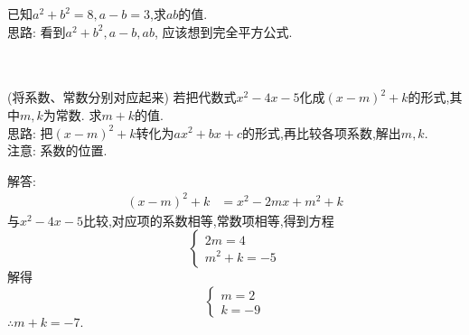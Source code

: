 \begin{comment}
    \item{
        若多项式$ 9x^2 - mx+16$是一个完全平方式,则 $m$的值是多少？
    }
    \\ \\ \\
\end{comment}

\item{
    已知$a^2+b^2=8, a-b=3$,求$ab$的值.
    \ifshowSolution
    \fangsong{}
    \\
    思路: 看到$a^2+b^2, a-b, ab$, 应该想到完全平方公式.
    \fi
}
\\ \\ \\

\begin{comment}
    \item{
        若$x^2+mx+9$是完全平方式,求常数$m$的值.
    }
    \\ \\ \\

    \item{
        若$x+y=2$,求代数式$x^2-y^2+4y$的值.
    }
    \\ \\ \\
\end{comment}

\item{
    (将系数、常数分别对应起来) 若把代数式$x^2-4x-5$化成$(x-m)^2+k$的形式,其中$m,k$为常数. 求$m+k$的值.
    \ifshowSolution
    \fangsong{}
    \\
    思路: 把$(x-m)^2+k$转化为$ax^2+bx+c$的形式,再比较各项系数,解出$m,k$.\\
    注意: 系数的位置.

    解答: 
    \begin{align*}
        (x-m)^2+k &= x^2-2mx+m^2+k
    \end{align*}
    与$x^2-4x-5$比较,对应项的系数相等,常数项相等,得到方程
    \[\left\{ 
        \begin{array}{lc}
            2m = 4\\
            m^2+k=-5
        \end{array}
    \right.\]
    解得
    \[\left\{ 
        \begin{array}{lc}
            m = 2\\
            k =-9
        \end{array}
    \right.\]
    $\therefore m+k=-7.$
    \fi
}
\\ \\ \\

